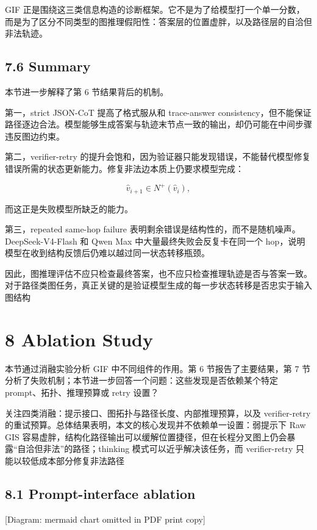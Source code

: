 \documentclass[
  11pt,
]{article}
\begin{document}
GIF
正是围绕这三类信息构造的诊断框架。它不是为了给模型打一个单一分数，而是为了区分不同类型的图推理假阳性：答案层的位置虚胖，以及路径层的自洽但非法轨迹。

\subsection{7.6 Summary}\label{summary-1}

本节进一步解释了第 6 节结果背后的机制。

第一，strict JSON-CoT 提高了格式服从和 trace-answer
consistency，但不能保证路径逐边合法。模型能够生成答案与轨迹末节点一致的输出，却仍可能在中间步骤违反图边约束。

第二，verifier-retry
的提升会饱和，因为验证器只能发现错误，不能替代模型修复错误所需的状态更新能力。修复非法边本质上仍要求模型完成：

\[
\hat{v}_{i+1}\in N^+(\hat{v}_i),  
\]

而这正是失败模型所缺乏的能力。

第三，repeated same-hop failure
表明剩余错误是结构性的，而不是随机噪声。DeepSeek-V4-Flash 和 Qwen Max
中大量最终失败会反复卡在同一个
hop，说明模型在收到结构反馈后仍难以越过同一状态转移瓶颈。

因此，图推理评估不应只检查最终答案，也不应只检查推理轨迹是否与答案一致。对于路径类图任务，真正关键的是验证模型生成的每一步状态转移是否忠实于输入图结构

\section{8 Ablation Study}\label{ablation-study}

本节通过消融实验分析 GIF 中不同组件的作用。第 6 节报告了主要结果，第 7
节分析了失败机制；本节进一步回答一个问题：这些发现是否依赖某个特定
prompt、拓扑、推理预算或 retry 设置？

关注四类消融：提示接口、图拓扑与路径长度、内部推理预算，以及
verifier-retry
的重试预算。总体结果表明，本文的核心发现并不依赖单一设置：弱提示下 Raw
GIS
容易虚胖，结构化路径输出可以缓解位置捷径，但在长程分叉图上仍会暴露``自洽但非法''的路径；thinking
模式可以近乎解决该任务，而 verifier-retry 只能以较低成本部分修复非法路径

\subsection{8.1 Prompt-interface
ablation}\label{prompt-interface-ablation}

{[}Diagram: mermaid chart omitted in PDF print copy{]}
\end{document}

